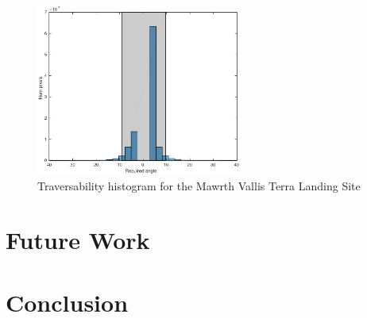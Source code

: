 \documentclass[12pt]{article}
\begin{document}
\begin{figure}[h!]
  \centering
  \includegraphics[width=0.6\textwidth]{figures/maps/ESP_015985_2040/DTEEC_015985_2040_016262_2040_U01-hist.pdf}
  \caption{Traversability histogram for the Mawrth Vallis Terra Landing Site}
  \label{fig:mawrth_hist}
\end{figure}



\section{Future Work}
\label{sec:future_work}


\section{Conclusion}
\label{sec:conclusion}
\end{document}
